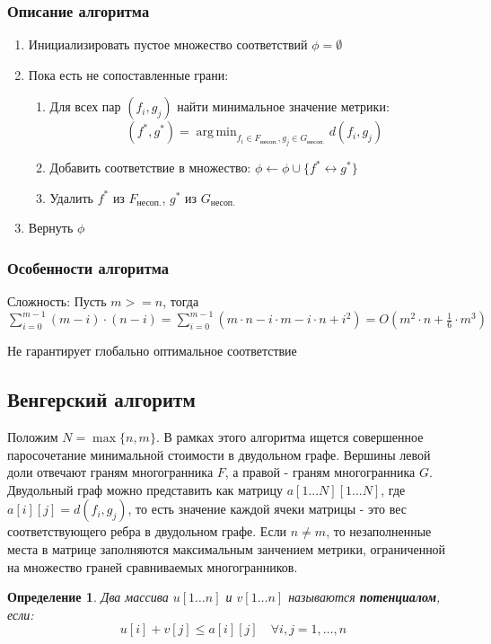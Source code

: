 \documentclass[a4paper,14pt]{extarticle}
\newtheorem{definition}{Определение}
\theoremstyle{remark} %
\DeclareMathOperator*{\argmin}{arg\,min}
\begin{document}
\subsubsection{Описание алгоритма}
\begin{enumerate}
    \item Инициализировать пустое множество соответствий $\phi = \emptyset$
    \item Пока есть не сопоставленные грани:
    \begin{enumerate}
        \item Для всех пар $(f_i, g_j)$ найти минимальное значение метрики:
            \[ (f^*, g^*) = \argmin_{f_i \in F_{\text{несоп.}}, g_j \in G_{\text{несоп.}}} d(f_i, g_j) \]
        \item Добавить соответствие в множество: $\phi \leftarrow \phi \cup \{f^* \leftrightarrow g^*\}$
        \item Удалить $f^*$ из $F_{\text{несоп.}}$, $g^*$ из $G_{\text{несоп.}}$
    \end{enumerate}
    \item Вернуть $\phi$
\end{enumerate}

\subsubsection{Особенности алгоритма}
Сложность:\newline
Пусть $m >= n$, тогда \newline
$\sum\limits_{i = 0}^{m - 1}(m - i) \cdot (n - i) = \sum\limits_{i = 0}^{m - 1}(m \cdot n - i \cdot m 
- i \cdot n + i^2) = O(m^2 \cdot n + \frac{1}{6} \cdot m^3)$\par
Не гарантирует глобально оптимальное соответствие


\subsection{Венгерский алгоритм}
Положим $N = \max \big\{ n, m \big\}$.
В рамках этого алгоритма ищется совершенное паросочетание минимальной стоимости в двудольном графе.
Вершины левой доли отвечают граням многогранника $F$, а правой - граням многогранника $G$.
Двудольный граф можно представить как матрицу $a[1...N][1...N]$, где $a[i][j] = d(f_i, g_j)$, то есть значение каждой ячеки матрицы - 
это вес соответствующего ребра в двудольном графе. Если  $n \neq m$, то незаполненные места в матрице заполняются
максимальным занчением метрики, ограниченной на множество граней сравниваемых многогранников.\par
\begin{definition}
Два массива $u[1 \ldots n]$ и $v[1 \ldots n]$ называются \textbf{потенциалом}, если:
\begin{equation*}
u[i] + v[j] \leq a[i][j] \quad \forall i,j = 1,\ldots,n
\end{equation*}
\end{definition}
\end{document}
